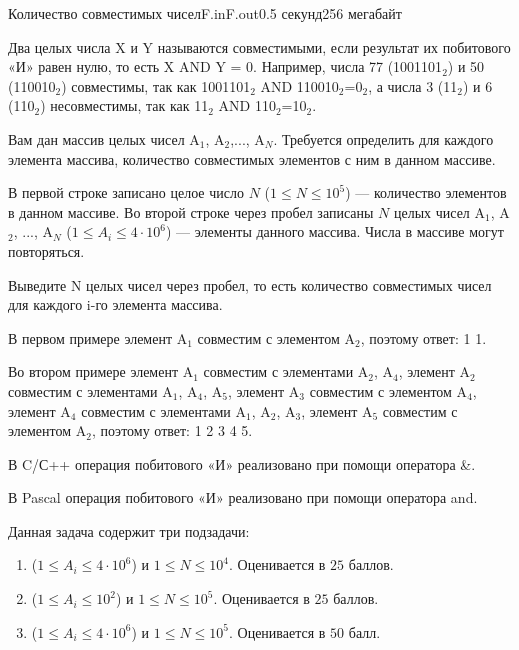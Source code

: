 \begin{problem}{Количество совместимых чисел}{F.in}{F.out}{0.5 секунд}{256 мегабайт}

Два целых числа X и Y называются совместимыми, если результат их побитового «И» равен нулю, то есть X AND Y = 0. Например, числа 77 (1001101${}_{2}$) и 50 (110010${}_{2}$) совместимы, так как 1001101${}_{2}$ AND 110010${}_{2}$=0${}_{2}$, а числа 3 (11${}_{2}$) и 6 (110${}_{2}$) несовместимы, так как 11${}_{2}$ AND 110${}_{2}$=10${}_{2}$.

Вам дан массив целых чисел A${}_{1}$, A${}_{2}$,..., A${}_{N}$. Требуется определить для каждого элемента массива, количество совместимых элементов с ним в данном массиве. 

\InputFile
В первой строке записано целое число $N$ ($1 \le N \le 10^5$) --- количество элементов в данном массиве. Во второй строке через пробел записаны $N$ целых чисел A${}_{1}$, A${}_{2}$, ..., A${}_{N}$ ($1 \le A_i \le 4 \cdot 10^6$) --- элементы данного массива. Числа в массиве могут повторяться.

\OutputFile
Выведите N целых чисел через пробел, то есть количество совместимых чисел для каждого i-го элемента массива.

\Examples

\begin{example}
%
%
%
\end{example}

\Note
В первом примере элемент A${}_{1}$ совместим с элементом A${}_{2}$, поэтому ответ: 1 1.

Во втором примере элемент A${}_{1}$ совместим с элементами A${}_{2}$, A${}_{4}$, элемент A${}_{2}$ совместим с элементами A${}_{1}$, A${}_{4}$, A${}_{5}$, элемент A${}_{3}$ совместим с элементом A${}_{4}$, элемент A${}_{4}$ совместим с элементами A${}_{1}$, A${}_{2}$, A${}_{3}$, элемент A${}_{5}$ совместим с элементом A${}_{2}$, поэтому ответ:
1 2 3 4 5.

В C/С++ операция побитового «И» реализовано при помощи оператора \&.

В Pascal операция побитового «И» реализовано при помощи оператора and.

\Scoring

Данная задача содержит три подзадачи:
\begin{enumerate}
\item ($1 \le A_i \le 4 \cdot 10^6$) и $1 \le N \le 10^4$. Оценивается в $25$ баллов.
\item ($1 \le A_i \le 10^2$) и $1 \le N \le 10^5$. Оценивается в $25$ баллов.
\item ($1 \le A_i \le 4 \cdot 10^6$) и $1 \le N \le 10^5$. Оценивается в $50$ балл.
\end{enumerate}

\end{problem}
